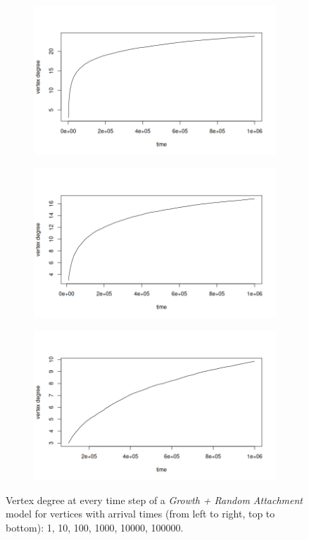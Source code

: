 \begin{figure}[ht]
\begin{subfigure}{.5\textwidth}
\end{subfigure}%
\begin{subfigure}{.5\textwidth}
  \centering
  \includegraphics[width=\linewidth]{figures/scaling_RA/sc_ra_3.png}
\end{subfigure}
\begin{subfigure}{.5\textwidth}
  \centering
  \includegraphics[width=\linewidth]{figures/scaling_RA/sc_ra_4.png}
\end{subfigure}%
\begin{subfigure}{.5\textwidth}
  \centering
  \includegraphics[width=\linewidth]{figures/scaling_RA/sc_ra_5.png}
\end{subfigure}
\caption{Vertex degree at every time step of a \textit{Growth + Random Attachment} model for vertices with arrival times (from left to right, top to bottom): 1, 10, 100, 1000, 10000, 100000.}
\label{fig:scaling_RA}
\end{figure}


